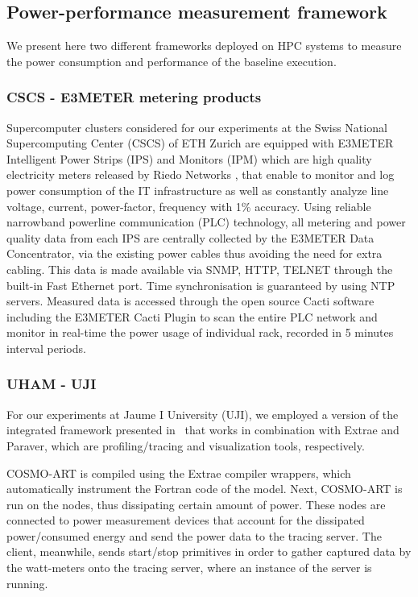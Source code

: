 \subsection{Power-performance measurement framework}
\label{subsec:3.3}

We present  here two different  frameworks deployed on HPC  systems to
measure  the  power  consumption   and  performance  of  the  baseline
execution.

\subsubsection{CSCS - E3METER metering products}

Supercomputer  clusters considered  for our  experiments at  the Swiss
National Supercomputing Center (CSCS)  of ETH Zurich are equipped with
E3METER Intelligent  Power Strips (IPS)  and Monitors (IPM)  which are
high   quality   electricity  meters   released   by  Riedo   Networks
\citep{Riedonetworks},   that  enable   to  monitor   and   log  power
consumption  of the IT  infrastructure as  well as  constantly analyze
line  voltage,  current, power-factor,  frequency  with 1\%  accuracy.
Using  reliable narrowband  powerline communication  (PLC) technology,
all  metering and  power  quality  data from  each  IPS are  centrally
collected  by the E3METER  Data Concentrator,  via the  existing power
cables thus  avoiding the need for  extra cabling.  This  data is made
available via  SNMP, HTTP, TELNET  through the built-in  Fast Ethernet
port.   Time  synchronisation  is  guaranteed by  using  NTP  servers.
Measured  data is  accessed  through the  open  source Cacti  software
including the E3METER Cacti Plugin  to scan the entire PLC network and
monitor in real-time the power usage of individual rack, recorded in 5
minutes interval periods.

\subsubsection{UHAM - UJI}

For our experiments at Jaume I University (UJI), we employed a version
of the integrated framework presented in~\cite{energy13} that works in
combination with  Extrae and Paraver, which  are profiling/tracing and
visualization tools, respectively.

COSMO-ART  is  compiled  using  the Extrae  compiler  wrappers,  which
automatically  instrument  the  Fortran   code  of  the  model.  Next,
COSMO-ART  is run  on the  nodes, thus  dissipating certain  amount of
power.  These  nodes are connected  to power measurement  devices that
account for  the dissipated power/consumed  energy and send  the power
data to  the tracing server.  The client,  meanwhile, sends start/stop
primitives in  order to gather  captured data by the  watt-meters onto
the tracing server, where an instance of the \pmlib server is running.

